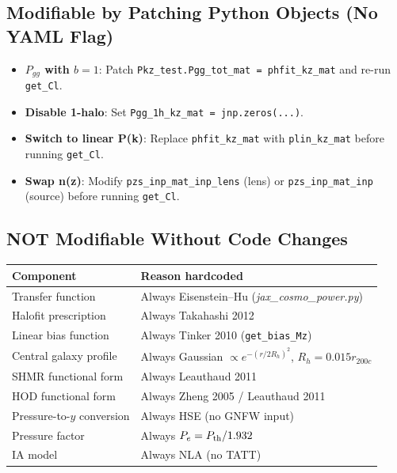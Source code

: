 \documentclass[12pt,a4paper]{article}
\newcommand{\code}[1]{\texttt{\small #1}}
\newcommand{\file}[1]{\textit{\small #1}}
\begin{document}
\subsection{Modifiable by Patching Python Objects (No YAML Flag)}

\begin{itemize}
  \item \textbf{$P_{gg}$ with $b=1$}: Patch \code{Pkz\_test.Pgg\_tot\_mat = phfit\_kz\_mat}
    and re-run \code{get\_Cl}.
  \item \textbf{Disable 1-halo}: Set \code{Pgg\_1h\_kz\_mat = jnp.zeros(...)}.
  \item \textbf{Switch to linear P(k)}: Replace \code{phfit\_kz\_mat} with
    \code{plin\_kz\_mat} before running \code{get\_Cl}.
  \item \textbf{Swap n(z)}: Modify \code{pzs\_inp\_mat\_inp\_lens} (lens) or
    \code{pzs\_inp\_mat\_inp} (source) before running \code{get\_Cl}.
\end{itemize}

\subsection{NOT Modifiable Without Code Changes}

\begin{center}
\begin{tabular}{ll}
\toprule
Component & Reason hardcoded \\
\midrule
Transfer function & Always Eisenstein--Hu (\file{jax\_cosmo\_power.py}) \\
Halofit prescription & Always Takahashi 2012 \\
Linear bias function & Always Tinker 2010 (\code{get\_bias\_Mz}) \\
Central galaxy profile & Always Gaussian $\propto e^{-(r/2R_h)^2}$, $R_h=0.015r_{200c}$ \\
SHMR functional form & Always Leauthaud 2011 \\
HOD functional form & Always Zheng 2005 / Leauthaud 2011 \\
Pressure-to-$y$ conversion & Always HSE (no GNFW input) \\
Pressure factor & Always $P_e = P_{\rm th}/1.932$ \\
IA model & Always NLA (no TATT) \\
\bottomrule
\end{tabular}
\end{center}

\end{document}
